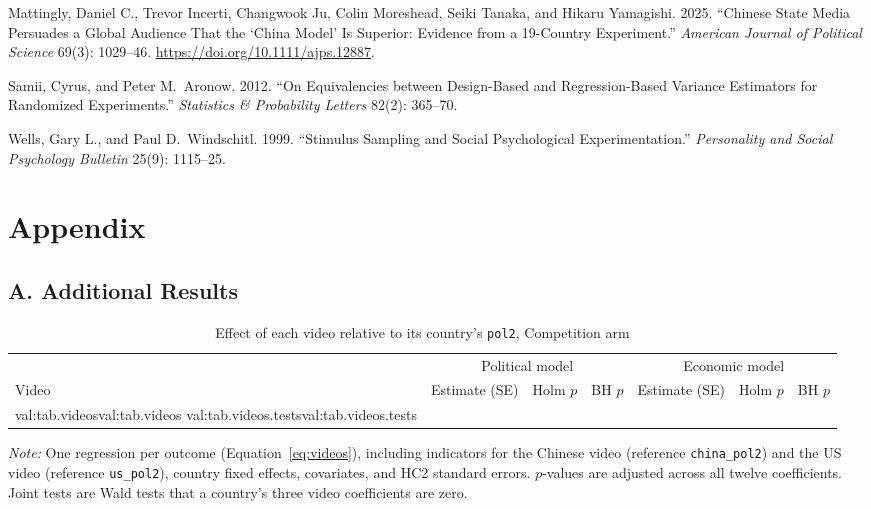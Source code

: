 \documentclass[11pt]{article}
\newcommand{\vid}[1]{\texttt{#1}}
\newcommand{\tablenote}[1]{\par\vspace{4pt}\begin{minipage}{\linewidth}\footnotesize #1\end{minipage}}
\newcommand{\val}[1]{\ifcsname val:#1\endcsname\else\errmessage{Undefined value: #1}\fi\csname val:#1\endcsname}
\begin{document}
\begin{description}
\item Mattingly, Daniel C., Trevor Incerti, Changwook Ju, Colin Moreshead, Seiki Tanaka, and Hikaru Yamagishi. 2025. ``Chinese State Media Persuades a Global Audience That the `China Model' Is Superior: Evidence from a 19-Country Experiment.'' \emph{American Journal of Political Science} 69(3): 1029--46. \url{https://doi.org/10.1111/ajps.12887}.
\item Samii, Cyrus, and Peter M.\ Aronow. 2012. ``On Equivalencies between Design-Based and Regression-Based Variance Estimators for Randomized Experiments.'' \emph{Statistics \& Probability Letters} 82(2): 365--70.
\item Wells, Gary L., and Paul D.\ Windschitl. 1999. ``Stimulus Sampling and Social Psychological Experimentation.'' \emph{Personality and Social Psychology Bulletin} 25(9): 1115--25.
\end{description}

\appendix
\section*{Appendix}
\renewcommand{\thetable}{A\arabic{table}}
\setcounter{table}{0}

\subsection*{A. Additional Results}

\begin{table}[H]
\centering
\caption{Effect of each video relative to its country's \vid{pol2}, Competition arm}
\label{tab:videos}
\begin{tabular}{lcccccc}
\toprule
 & \multicolumn{3}{c}{Political model} & \multicolumn{3}{c}{Economic model} \\
\cmidrule(lr){2-4}\cmidrule(lr){5-7}
Video & Estimate (SE) & Holm $p$ & BH $p$ & Estimate (SE) & Holm $p$ & BH $p$ \\
\midrule
\val{tab.videos}
\midrule
\val{tab.videos.tests}
\bottomrule
\end{tabular}
\tablenote{\emph{Note:} One regression per outcome (Equation~\ref{eq:videos}), including indicators for the Chinese video (reference \vid{china\_pol2}) and the US video (reference \vid{us\_pol2}), country fixed effects, covariates, and HC2 standard errors. $p$-values are adjusted across all twelve coefficients. Joint tests are Wald tests that a country's three video coefficients are zero.}
\end{table}
\end{document}
